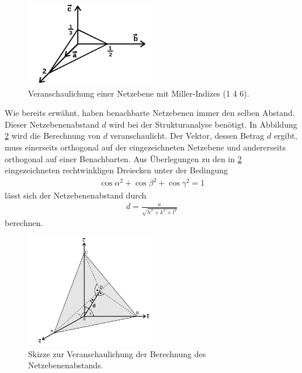 \begin{figure}[hhh]
  \centering
  \includegraphics[width=0.5\textwidth]{abbildungen/miller_ind.png}
  \caption{Veranschaulichung einer Netzebene mit Miller-Indizes (1 4 6).\cite{sample}}
  \label{fig:miller_ind}
\end{figure}

Wie bereits erwähnt, haben benachbarte Netzebenen immer
den selben Abstand. Dieser Netzebenenabstand $d$ wird bei der
Strukturanalyse benötigt. In Abbildung \ref{fig:miller_abstand} wird
die Berechnung von $d$ veranschaulicht. Der Vektor, dessen Betrag $d$ ergibt,
muss einerseits orthogonal auf der eingezeichneten Netzebene und andererseits orthogonal
auf einer Benachbarten. Aus Überlegungen zu den in \ref{fig:miller_abstand}
eingezeichneten rechtwinkligen Dreiecken unter der Bedingung
\begin{align}
  \label{eqn:4}
  \cos\alpha^2 + \cos\beta^2 + \cos\gamma^2 = 1
\end{align}
lässt sich der Netzebenenabstand
durch
\begin{align}
  \label{eqn:5}
  d = \frac{a}{\sqrt{h^2 + k^2 + l^2}}
\end{align}
berechnen.

\begin{figure}[hhh]
  \centering
  \includegraphics[width=0.5\textwidth]{abbildungen/miller_dist.png}
  \caption{Skizze zur Veranschaulichung der Berechnung des Netzebenenabstands.\cite{sample}}
  \label{fig:miller_abstand}
\end{figure}

